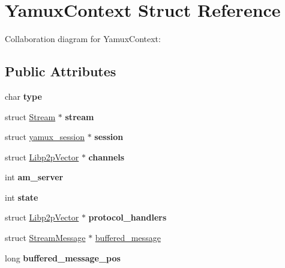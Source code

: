 \hypertarget{struct_yamux_context}{}\section{Yamux\+Context Struct Reference}
\label{struct_yamux_context}


Collaboration diagram for Yamux\+Context\+:
\subsection*{Public Attributes}
\begin{DoxyCompactItemize}
\item 
\mbox{\label{struct_yamux_context_a18a43cf010afd8761c9b368ac5264b71}} 
char {\bfseries type}
\item 
\mbox{\label{struct_yamux_context_a9173dde91a83782adf3948964411c2ce}} 
struct \mbox{\hyperlink{struct_stream}{Stream}} $\ast$ {\bfseries stream}
\item 
\mbox{\label{struct_yamux_context_ad2116fb2f861df6747ffa40e3dde408e}} 
struct \mbox{\hyperlink{structyamux__session}{yamux\+\_\+session}} $\ast$ {\bfseries session}
\item 
\mbox{\label{struct_yamux_context_a76f975aa90d8c45b977763606deb903b}} 
struct \mbox{\hyperlink{struct_libp2p_vector}{Libp2p\+Vector}} $\ast$ {\bfseries channels}
\item 
\mbox{\label{struct_yamux_context_af9d8054352d3b04e3de4647f9b8cc695}} 
int {\bfseries am\+\_\+server}
\item 
\mbox{\label{struct_yamux_context_a48045c070e3a0ba7c0b9724f6bc64e4d}} 
int {\bfseries state}
\item 
\mbox{\label{struct_yamux_context_a31db478fbdc2d6ed97e6f011182980cc}} 
struct \mbox{\hyperlink{struct_libp2p_vector}{Libp2p\+Vector}} $\ast$ {\bfseries protocol\+\_\+handlers}
\item 
struct \mbox{\hyperlink{struct_stream_message}{Stream\+Message}} $\ast$ \mbox{\hyperlink{struct_yamux_context_aead2ca72642a6109167f0fe86cf6f728}{buffered\+\_\+message}}
\item 
\mbox{\label{struct_yamux_context_a3ee6f36f0b1b8f231584d0bc45a98d5f}} 
long {\bfseries buffered\+\_\+message\+\_\+pos}
\end{DoxyCompactItemize}


